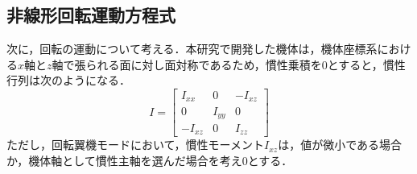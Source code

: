
\subsection{非線形回転運動方程式}

次に，回転の運動について考える．本研究で開発した機体は，機体座標系における$x$軸と$z$軸で張られる面に対し面対称であるため，慣性乗積を0とすると，慣性行列は次のようになる．
\begin{equation}
  I =
  \left[
  \begin{array}{ccc}
    I_{xx} & 0 & -I_{xz} \\
    0 & I_{yy} & 0 \\
    -I_{xz} & 0 & I_{zz}
  \end{array}
  \right]
\end{equation}
ただし，回転翼機モードにおいて，慣性モーメント$I_{xz}$は，値が微小である場合か，機体軸として慣性主軸を選んだ場合を考え0とする．

